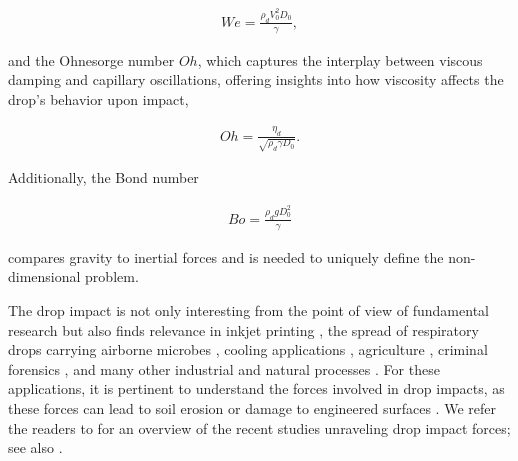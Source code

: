 \documentclass{jfm}
\begin{document}
	\begin{align}
		\label{Eq:WeDefinition}
		We = \frac{\rho_d V_0^2 D_0}{\gamma},
	\end{align}
	
	\noindent and the Ohnesorge number $Oh$, which captures the interplay between viscous damping and capillary oscillations, offering insights into how viscosity affects the drop's behavior upon impact,
	
	\begin{align}
		\label{Eq:OhDefinition}
		Oh = \frac{\eta_d}{\sqrt{\rho_d \gamma D_0}}.
	\end{align}
	
	\noindent Additionally, the Bond number
	
	\begin{align}
		\label{Eq:BoDefinition}
		Bo = \frac{\rho_dgD_0^2}{\gamma}
	\end{align}
	
	\noindent compares gravity to inertial forces and is needed to uniquely define the non-dimensional problem.  
	
	The drop impact is not only interesting from the point of view of fundamental research but also finds relevance in inkjet printing \citep{lohse2022fundamental}, the spread of respiratory drops carrying airborne microbes \citep{bourouiba2021fluid, ji2021compound, pohlker2023respiratory}, cooling applications \citep{kim2007spray, shiri2017heat, jowkar2019rebounding}, agriculture \citep{bergeron2000controlling, bartolo2007dynamics, kooij2018determines, sijs2020effect, he2021optimization, hoffman2021controlling}, criminal forensics \citep{smith2018influence, smith-2018-curropincolloidinterfacesci}, and many other industrial and natural processes \citep{rein-1993-fluiddynres, yarin2006drop, Tuteja2007, Cho2016, Josserand2016, Yarin2017, Liu2017, Hao2016, Yarin2017, Wu2020}. For these applications, it is pertinent to understand the forces involved in drop impacts, as these forces can lead to soil erosion \citep{Nearing1986} or damage to engineered surfaces \citep{Ahmad2013, Amirzadeh2017, Gohardani2011}. We refer the readers to \citet{cheng2021drop} for an overview of the recent studies unraveling drop impact forces; see also \citet{Li2014, Soto2014, Philippi2016, Zhang2017, Gordillo2018, Mitchell2019, Zhang2019}. 
	
\end{document}
